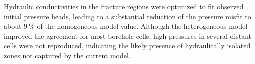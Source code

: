 Hydraulic conductivities in the fracture regions were optimized to fit observed initial pressure heads, leading to a substantial reduction of the pressure misfit to about $9~\%$ of the homogeneous model value. Although the heterogeneous model improved the agreement for most borehole cells, high pressures in several distant cells were not reproduced, indicating the likely presence of hydraulically isolated zones not captured by the current model.




% 
